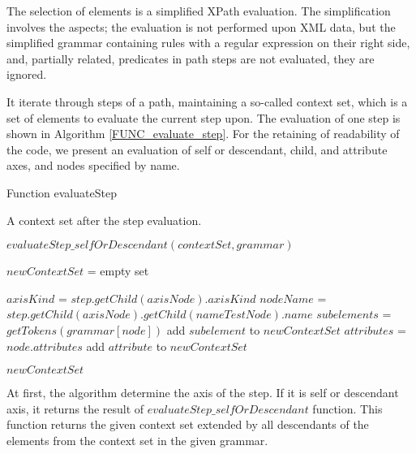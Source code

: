 The selection of elements is a simplified XPath evaluation. The simplification involves the aspects; the evaluation is not performed upon XML data, but the simplified grammar containing rules with a regular expression on their right side, and, partially related, predicates in path steps are not evaluated, they are ignored.

It iterate through steps of a path, maintaining a so-called context set, which is a set of elements to evaluate the current step upon. The evaluation of one step is shown in Algorithm \ref{FUNC_evaluate_step}. For the retaining of readability of the code, we present an evaluation of self or descendant, child, and attribute axes, and nodes specified by name.

\begin{algorithm}
\caption{Function evaluateStep}
\label{FUNC_evaluate_step}
\begin{algorithmic}[1]

\ENSURE A context set after the step evaluation.

	\RETURN $evaluateStep\_selfOrDescendant(contextSet, grammar)$
\ENDIF

\STATE $newContextSet$ = empty set

\STATE $axisKind$ = $step.getChild(axisNode).axisKind$
\STATE $nodeName$ = $step.getChild(axisNode).getChild(nameTestNode).name$
			\STATE $subelements$ = $getTokens(grammar[node])$
					\STATE add $subelement$ to $newContextSet$
				\ENDIF
			\ENDFOR
		\ENDIF
	\ENDFOR
{}
			\STATE $attributes$ = $node.attributes$
					\STATE add $attribute$ to $newContextSet$
				\ENDIF
			\ENDFOR
		\ENDIF
	\ENDFOR
\ENDIF

\RETURN $newContextSet$
\end{algorithmic}
\end{algorithm}

At first, the algorithm determine the axis of the step. If it is self or descendant axis, it returns the result of $evaluateStep\_selfOrDescendant$ function. This function returns the given context set extended by all descendants of the elements from the context set in the given grammar.


